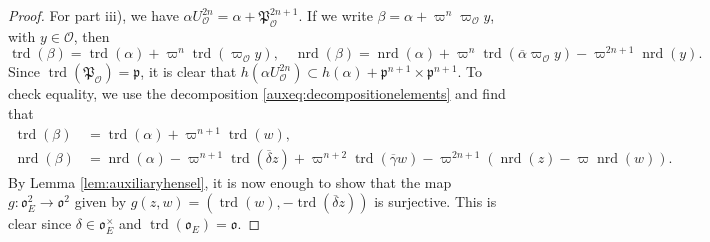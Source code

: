 \documentclass[10pt,a4paper]{amsart}
\DeclareMathOperator{\nrd}{nrd}
\DeclareMathOperator{\trd}{trd}
\newcommand{\p}{\mathfrak{p}}
\renewcommand{\O}{\mathcal{O}}
\renewcommand{\P}{\mathfrak{P}}
\renewcommand{\o}{\mathfrak{o}}
\begin{document}
\begin{proof}
For part iii), we have $\alpha U_\O^{2n} = \alpha + \P_\O^{2n + 1}$. If we write $\beta = \alpha + \varpi^n \varpi_\O y$, with $y \in \O$, then 
\begin{equation*}
    \trd(\beta) = \trd(\alpha) + \varpi^n \trd(\varpi_\O y), \quad \nrd(\beta) = \nrd(\alpha) + \varpi^n \trd(\overline{\alpha}\varpi_\O y) - \varpi^{2n + 1} \nrd(y).
\end{equation*}
Since $\trd(\P_\O) = \p$, it is clear that $h(\alpha U_\O^{2n}) \subset h(\alpha) + \p^{n + 1} \times \p^{n + 1}$. To check equality, we use the decomposition \eqref{auxeq:decompositionelements} and find that
\begin{equation*}
\begin{aligned}
    \trd(\beta) & = \trd(\alpha) + \varpi^{n + 1} \trd(w),\\
    \nrd(\beta) & = \nrd(\alpha) -\varpi^{n+1}\trd(\overline{\delta}z) + \varpi^{n + 2}\trd(\overline{\gamma}w) - \varpi^{2n + 1}(\nrd(z) - \varpi \nrd(w)).
\end{aligned}
\end{equation*} 
By Lemma \ref{lem:auxiliaryhensel}, it is now enough to show that the map $g: \o_E^2 \rightarrow \o^2$ given by $g(z, w) = (\trd(w), -\trd(\overline{\delta}z))$ is surjective. This is clear since $\delta \in \o_E^\times$ and $\trd(\o_E) = \o$.
\end{proof}
\end{document}
